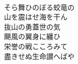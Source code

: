 \documentclass[10pt,b5j]{tarticle} %
\begin{document}
\begin{enumerate}
\begin{minipage}[c]{\blocksize}
    \end{minipage}
    \begin{minipage}[c]{\blocksize}
        
        \vspace{\linespace}
        \item~\\
        そら舞ひのぼる蛟竜の\\
        山を震はせ海を干ん\\
        抜山の勇蓋世の気\\
        颶風の翼身に纏ひ\\
        栄誉の戦こころみて\\
        盡きせぬ生命讃へばや
    
    \end{minipage}
\end{enumerate} %
\end{document}
